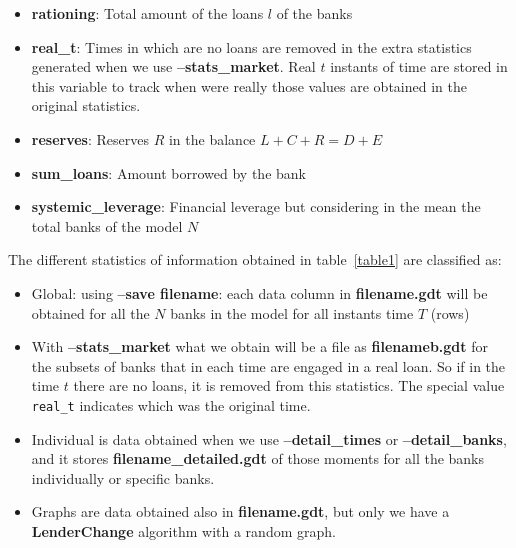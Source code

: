 \documentclass{article}
\begin{document}
\begin{itemize}
    \item \textbf{rationing}: Total amount of the loans $l$ of the banks
    \item \textbf{real\_t}: Times in which are no loans are removed in the extra statistics generated when we use \textbf{--stats\_market}. Real $t$ instants of time are stored in this variable to track when were really those values are obtained in the original statistics.
    \item \textbf{reserves}: Reserves $R$ in the balance $L + C + R = D + E$
    \item \textbf{sum\_loans}: Amount borrowed by the bank
    \item \textbf{systemic\_leverage}: Financial leverage but considering in the mean the total banks of the model $N$
\end{itemize}


The different statistics of information obtained in table~\ref{table1} are classified as:
\begin{itemize}
        \item Global: using \textbf{--save filename}: each data column in \textbf{filename.gdt}  will be obtained for all the $N$ banks in the model for all instants time $T$ (rows)
        \item With \textbf{--stats\_market} what we obtain will be a file as \textbf{filenameb.gdt} for the subsets of banks that in each time are engaged in a real loan. So if in the time $t$ there are no loans, it is removed from this statistics. The special value \texttt{real\_t} indicates which was the original time.
        \item Individual is data obtained when we use \textbf{--detail\_times} or \textbf{--detail\_banks}, and it stores  \textbf{filename\_detailed.gdt}  of those moments for all the banks individually or specific banks.
        \item Graphs are data obtained also in \textbf{filename.gdt}, but only we have a \textbf{LenderChange} algorithm with a random graph.
    \end{itemize}
\end{document}
